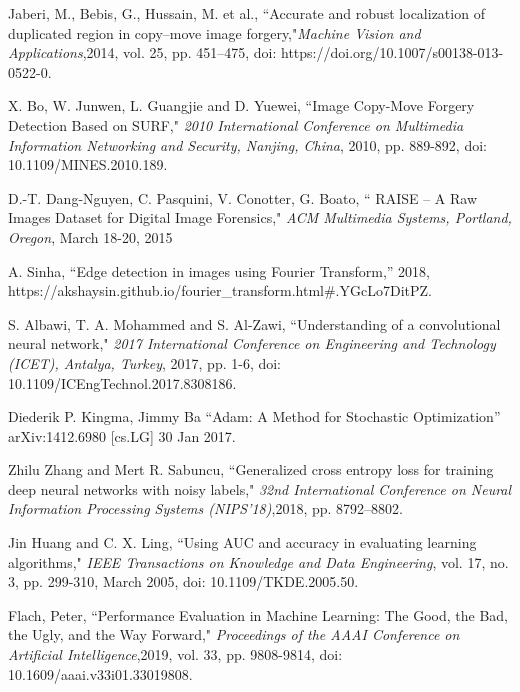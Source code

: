 \documentclass[conference]{IEEEtran}
\begin{document}
\begin{thebibliography}{00}
Jaberi, M., Bebis, G., Hussain, M. et al., “Accurate and robust localization of duplicated region in copy–move image forgery,"\textit{Machine Vision and Applications},2014, vol. 25, pp. 451–475, doi: https://doi.org/10.1007/s00138-013-0522-0.

X. Bo, W. Junwen, L. Guangjie and D. Yuewei, “Image Copy-Move Forgery Detection Based on SURF," \textit{2010 International Conference on Multimedia Information Networking and Security, Nanjing, China}, 2010, pp. 889-892, doi: 10.1109/MINES.2010.189.

D.-T. Dang-Nguyen, C. Pasquini, V. Conotter, G. Boato, “ RAISE – A Raw Images Dataset for Digital Image Forensics,"\textit{ ACM Multimedia Systems, Portland, Oregon}, March 18-20, 2015

A. Sinha, “Edge detection in images using Fourier Transform,” 2018, https://akshaysin.github.io/fourier\_transform.html\#.YGcLo7DitPZ.

S. Albawi, T. A. Mohammed and S. Al-Zawi, “Understanding of a convolutional neural network," \textit{2017 International Conference on Engineering and Technology (ICET), Antalya, Turkey}, 2017, pp. 1-6, doi: 10.1109/ICEngTechnol.2017.8308186.

Diederik P. Kingma, Jimmy Ba “Adam: A Method for Stochastic Optimization” arXiv:1412.6980 [cs.LG] 30 Jan 2017.

Zhilu Zhang and Mert R. Sabuncu, “Generalized cross entropy loss for training deep neural networks with noisy labels," \textit{ 32nd International Conference on Neural Information Processing Systems (NIPS'18)},2018, pp. 8792–8802.

Jin Huang and C. X. Ling, “Using AUC and accuracy in evaluating learning algorithms," \textit{IEEE Transactions on Knowledge and Data Engineering}, vol. 17, no. 3, pp. 299-310, March 2005, doi: 10.1109/TKDE.2005.50.

Flach, Peter, “Performance Evaluation in Machine Learning: The Good, the Bad, the Ugly, and the Way Forward,"\textit{ Proceedings of the AAAI Conference on Artificial Intelligence},2019, vol. 33, pp. 9808-9814, doi: 10.1609/aaai.v33i01.33019808. 


\end{thebibliography}
\end{document}
